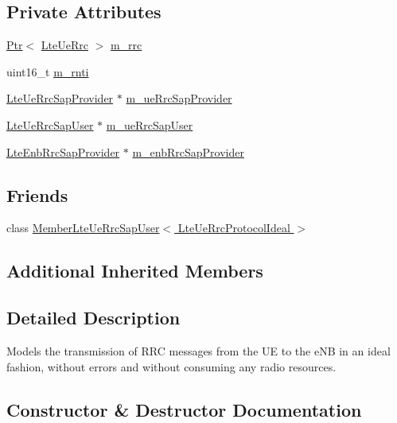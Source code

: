 \subsection*{Private Attributes}
\begin{DoxyCompactItemize}
\item 
\hyperlink{classns3_1_1Ptr}{Ptr}$<$ \hyperlink{classns3_1_1LteUeRrc}{Lte\+Ue\+Rrc} $>$ \hyperlink{classns3_1_1LteUeRrcProtocolIdeal_a09b70de3e8f4aeed8e0de75f3cf49116}{m\+\_\+rrc}
\item 
uint16\+\_\+t \hyperlink{classns3_1_1LteUeRrcProtocolIdeal_a89863bae51a39a5d6c88809513b1bb2e}{m\+\_\+rnti}
\item 
\hyperlink{classns3_1_1LteUeRrcSapProvider}{Lte\+Ue\+Rrc\+Sap\+Provider} $\ast$ \hyperlink{classns3_1_1LteUeRrcProtocolIdeal_ae13167062799872f32a28dd0796b090f}{m\+\_\+ue\+Rrc\+Sap\+Provider}
\item 
\hyperlink{classns3_1_1LteUeRrcSapUser}{Lte\+Ue\+Rrc\+Sap\+User} $\ast$ \hyperlink{classns3_1_1LteUeRrcProtocolIdeal_a52af9afef00a6f401fb8005d3caa520f}{m\+\_\+ue\+Rrc\+Sap\+User}
\item 
\hyperlink{classns3_1_1LteEnbRrcSapProvider}{Lte\+Enb\+Rrc\+Sap\+Provider} $\ast$ \hyperlink{classns3_1_1LteUeRrcProtocolIdeal_aace91c64d1b2fea461aabeb5dd3b0db6}{m\+\_\+enb\+Rrc\+Sap\+Provider}
\end{DoxyCompactItemize}
\subsection*{Friends}
\begin{DoxyCompactItemize}
\item 
class \hyperlink{classns3_1_1LteUeRrcProtocolIdeal_a39d24d46216e7b022ca487ff9969cf10}{Member\+Lte\+Ue\+Rrc\+Sap\+User$<$ Lte\+Ue\+Rrc\+Protocol\+Ideal $>$}
\end{DoxyCompactItemize}
\subsection*{Additional Inherited Members}


\subsection{Detailed Description}
Models the transmission of R\+RC messages from the UE to the e\+NB in an ideal fashion, without errors and without consuming any radio resources. 

\subsection{Constructor \& Destructor Documentation}
